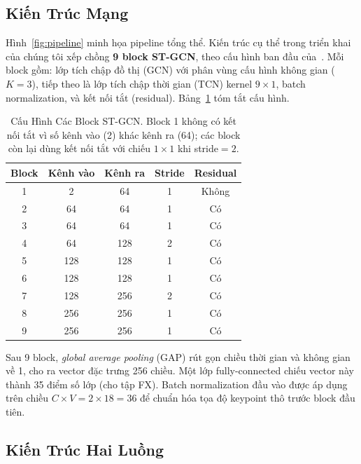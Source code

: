 \documentclass[conference]{IEEEtran}
\begin{document}
\subsection{Kiến Trúc Mạng}
\label{sec:arch}

Hình~\ref{fig:pipeline} minh họa pipeline tổng thể. Kiến trúc cụ thể
trong triển khai của chúng tôi xếp chồng \textbf{9 block ST-GCN}, theo
cấu hình ban đầu của~\cite{yan2018stgcn}. Mỗi block gồm: lớp tích chập
đồ thị (GCN) với phân vùng cấu hình không gian ($K=3$), tiếp theo là
lớp tích chập thời gian (TCN) kernel $9 \times 1$, batch normalization,
và kết nối tắt (residual). Bảng~\ref{tab:arch} tóm tắt cấu hình.

\begin{table}[!t]
\caption{Cấu Hình Các Block ST-GCN. Block 1 không có kết nối tắt vì số
kênh vào (2) khác kênh ra (64); các block còn lại dùng kết nối tắt
với chiếu $1\times1$ khi stride$=2$.}
\label{tab:arch}
\centering
\begin{tabular}{ccccc}
\toprule
Block & Kênh vào & Kênh ra & Stride & Residual \\
\midrule
1 & 2    & 64  & 1 & Không \\
2 & 64   & 64  & 1 & Có    \\
3 & 64   & 64  & 1 & Có    \\
4 & 64   & 128 & 2 & Có    \\
5 & 128  & 128 & 1 & Có    \\
6 & 128  & 128 & 1 & Có    \\
7 & 128  & 256 & 2 & Có    \\
8 & 256  & 256 & 1 & Có    \\
9 & 256  & 256 & 1 & Có    \\
\bottomrule
\end{tabular}
\end{table}

Sau 9 block, \textit{global average pooling} (GAP) rút gọn chiều thời
gian và không gian về 1, cho ra vector đặc trưng 256 chiều. Một lớp
fully-connected chiếu vector này thành 35 điểm số lớp (cho tập FX).
Batch normalization đầu vào được áp dụng trên chiều $C \times V = 2
\times 18 = 36$ để chuẩn hóa tọa độ keypoint thô trước block đầu tiên.

\subsection{Kiến Trúc Hai Luồng}
\label{sec:twostream}
\end{document}

